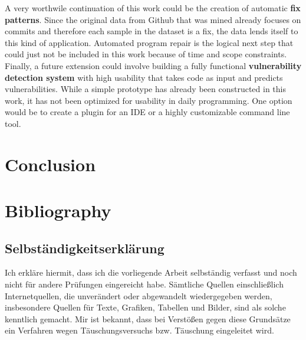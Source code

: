 \documentclass[
	a4paper,
	pagesize,
	pdftex,
	12pt,
	twoside, %
	BCOR=5mm, %
	ngerman,
	fleqn,
	final,
	]{scrartcl}
\begin{document}
A very worthwile continuation of this work could be the creation of automatic \textbf{fix patterns}. Since the original data from Github that was mined already focuses on commits and therefore each sample in the dataset is a fix, the data lends itself to this kind of application. Automated program repair is the logical next step that could just not be included in this work because of time and scope constraints.\\
Finally, a future extension could involve building a fully functional \textbf{vulnerability detection system} with high usability that takes code as input and predicts vulnerabilities. While a simple prototype has already been constructed in this work, it has not been optimized for usability in daily programming. One option would be to create a plugin for an IDE or a highly customizable command line tool.








\newpage
\section{Conclusion}







\section{Bibliography}






\cleardoublepage%
{\parindent0cm
	\subsection*{Selbständigkeitserklärung}
	Ich erkläre hiermit, dass ich die vorliegende Arbeit selbständig verfasst
	und noch nicht für andere Prüfungen eingereicht habe.
	Sämtliche Quellen einschließlich Internetquellen, die unverändert oder
	abgewandelt wiedergegeben werden, insbesondere Quellen für Texte, Grafiken,
	Tabellen und Bilder, sind als solche kenntlich gemacht. Mir ist bekannt,
	dass bei Verstößen gegen diese Grundsätze ein Verfahren wegen
	Täuschungsversuchs bzw. Täuschung eingeleitet wird.
	\vspace{3\baselineskip}
	
}
\end{document}
